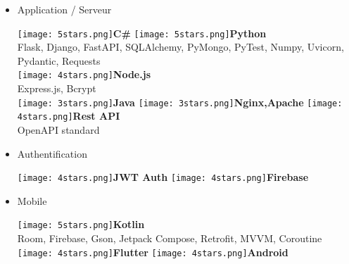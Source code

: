 \documentclass[]{friggeri-cv}
\begin{document}
\begin{flushleft}
\begin{multicols}{3}
\begin{itemize}
\columnbreak
\item \large Application / Serveur \
\normalsize
\begin{flushleft}

\texttt{[image: 5stars.png]}\hspace{1.5mm}\textbf{C\#}
\texttt{[image: 5stars.png]}\hspace{1.5mm}\textbf{Python}\\Flask, Django, FastAPI, SQLAlchemy, PyMongo, PyTest, Numpy, Uvicorn, Pydantic, Requests\\\vspace{2mm}
\texttt{[image: 4stars.png]}\hspace{1.5mm}\textbf{Node.js}\\Express.js, Bcrypt\\
\texttt{[image: 3stars.png]}\hspace{1.5mm}\textbf{Java}
\texttt{[image: 3stars.png]}\hspace{1.5mm}\textbf{\small Nginx,Apache}
\texttt{[image: 4stars.png]}\hspace{1.5mm}\textbf{Rest API}\\OpenAPI standard\\
\end{flushleft}            

\item \large Authentification \
\normalsize
\begin{flushleft}

\texttt{[image: 4stars.png]}\hspace{1.5mm}\textbf{JWT Auth}
\texttt{[image: 4stars.png]}\hspace{1.5mm}\textbf{Firebase}
\end{flushleft}            

\columnbreak
\item \large Mobile \
\normalsize
\begin{flushleft}

\texttt{[image: 5stars.png]}\hspace{1.5mm}\textbf{Kotlin}\\Room, Firebase, Gson, Jetpack Compose, Retrofit, MVVM, Coroutine\\\vspace{2mm}
\texttt{[image: 4stars.png]}\hspace{1.5mm}\textbf{Flutter}
\texttt{[image: 4stars.png]}\hspace{1.5mm}\textbf{Android}
\end{flushleft}            


\end{itemize}
\end{multicols}
\end{flushleft}
\end{document}
